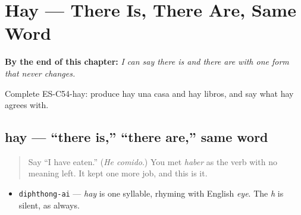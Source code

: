 
\chapter{Hay --- There Is, There Are, Same Word}
\label{ch:hay}

\begin{chapteropening}
\textbf{By the end of this chapter:} \emph{I can say there is and there are with one form that never changes.}

Complete ES-C54-hay: produce hay una casa and hay libros, and say what hay agrees with.
\end{chapteropening}

\section[hay]{hay — \textquotedblleft{}there is,\textquotedblright{} \textquotedblleft{}there are,\textquotedblright{} same word}

\label{lesson:ES-C54-hay}



\begin{quote}
Say \textquotedblleft{}I have eaten.\textquotedblright{} (\emph{He comido}.) You met \emph{haber} as the verb with no meaning left. It kept one more job, and this is it.
\end{quote}

\begin{sounds}
\begin{itemize}
\raggedright
  \item \texttt{diphthong-ai} — \emph{hay} is one syllable, rhyming with English \emph{eye}. The \emph{h} is silent, as always.
\end{itemize}
\end{sounds}

